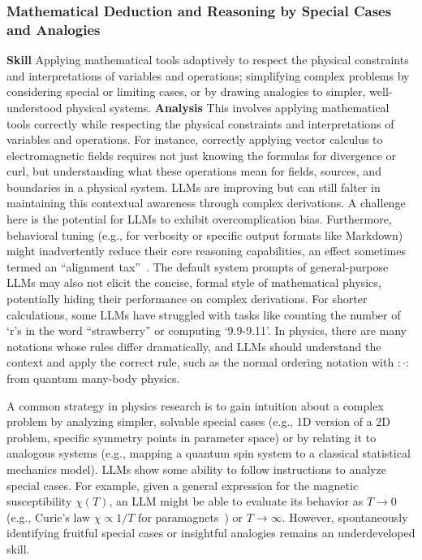 \subsubsection{Mathematical Deduction and Reasoning by Special Cases and Analogies}
\label{sec:skill_math_physics_context_special}
\textbf{Skill} Applying mathematical tools adaptively to respect the physical constraints and interpretations of variables and operations; simplifying complex problems by considering special or limiting cases, or by drawing analogies to simpler, well-understood physical systems.
\textbf{Analysis} This involves applying mathematical tools correctly while respecting the physical constraints and interpretations of variables and operations. For instance, correctly applying vector calculus to electromagnetic fields requires not just knowing the formulas for divergence or curl, but understanding what these operations mean for fields, sources, and boundaries in a physical system. LLMs are improving but can still falter in maintaining this contextual awareness through complex derivations.
A challenge here is the potential for LLMs to exhibit overcomplication bias. Furthermore, behavioral tuning (e.g., for verbosity or specific output formats like Markdown) might inadvertently reduce their core reasoning capabilities, an effect sometimes termed an ``alignment tax''~\cite{Askell2021General}. The default system prompts of general-purpose LLMs may also not elicit the concise, formal style of mathematical physics, potentially hiding their performance on complex derivations. For shorter calculations, some LLMs have struggled with tasks like counting the number of `r's in the word ``strawberry'' or computing `9.9-9.11'. In physics, there are many notations whose rules differ dramatically, and LLMs should understand the context and apply the correct rule, such as the normal ordering notation with $\colon\cdot\colon$ from quantum many-body physics.

A common strategy in physics research is to gain intuition about a complex problem by analyzing simpler, solvable special cases (e.g., 1D version of a 2D problem, specific symmetry points in parameter space) or by relating it to analogous systems (e.g., mapping a quantum spin system to a classical statistical mechanics model). LLMs show some ability to follow instructions to analyze special cases. For example, given a general expression for the magnetic susceptibility $\chi(T)$, an LLM might be able to evaluate its behavior as $T \to 0$ (e.g., Curie's law $\chi \propto 1/T$ for paramagnets~\cite{Kittel2004Introduction}) or $T \to \infty$. However, spontaneously identifying fruitful special cases or insightful analogies remains an underdeveloped skill.

